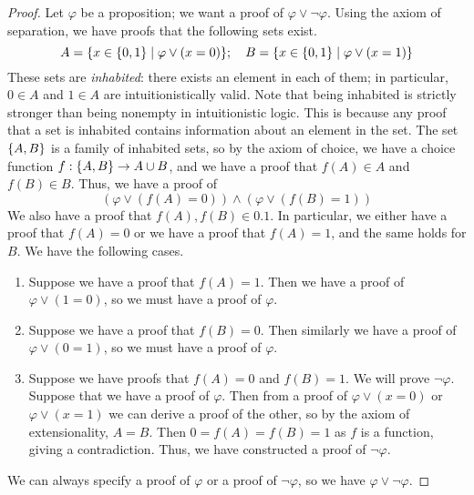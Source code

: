 \begin{proof}
    Let \( \varphi \) be a proposition; we want a proof of \( \varphi \vee \neg \varphi \).
    Using the axiom of separation, we have proofs that the following sets exist.
    \[ A = \qty{x \in \qty{0, 1} \mid \varphi \vee (x = 0)};\quad B = \qty{x \in \qty{0, 1} \mid \varphi \vee (x = 1)} \]
    These sets are \emph{inhabited}: there exists an element in each of them; in particular, \( 0 \in A \) and \( 1 \in A \) are intuitionistically valid.
    Note that being inhabited is strictly stronger than being nonempty in intuitionistic logic.
    This is because any proof that a set is inhabited contains information about an element in the set.
    The set \( \qty{A, B} \) is a family of inhabited sets, so by the axiom of choice, we have a choice function \( f : \qty{A, B} \to A \cup B \), and we have a proof that \( f(A) \in A \) and \( f(B) \in B \).
    Thus, we have a proof of
    \[ (\varphi \vee (f(A) = 0)) \wedge (\varphi \vee (f(B) = 1)) \]
    We also have a proof that \( f(A), f(B) \in \qty{0,1} \).
    In particular, we either have a proof that \( f(A) = 0 \) or we have a proof that \( f(A) = 1 \), and the same holds for \( B \).
    We have the following cases.
    \begin{enumerate}
        \item Suppose we have a proof that \( f(A) = 1 \).
        Then we have a proof of \( \varphi \vee (1 = 0) \), so we must have a proof of \( \varphi \).
        \item Suppose we have a proof that \( f(B) = 0 \).
        Then similarly we have a proof of \( \varphi \vee (0 = 1) \), so we must have a proof of \( \varphi \).
        \item Suppose we have proofs that \( f(A) = 0 \) and \( f(B) = 1 \).
        We will prove \( \neg \varphi \).
        Suppose that we have a proof of \( \varphi \).
        Then from a proof of \( \varphi \vee (x = 0) \) or \( \varphi \vee (x = 1) \) we can derive a proof of the other, so by the axiom of extensionality, \( A = B \).
        Then \( 0 = f(A) = f(B) = 1 \) as \( f \) is a function, giving a contradiction.
        Thus, we have constructed a proof of \( \neg\varphi \).
    \end{enumerate}
    We can always specify a proof of \( \varphi \) or a proof of \( \neg \varphi \), so we have \( \varphi \vee \neg \varphi \).
\end{proof}
